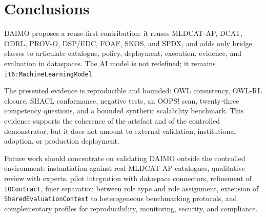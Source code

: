 \documentclass[Afour,sagev,times]{sagej}
\newcommand{\code}[1]{\texttt{#1}}
\begin{document}
\section{Conclusions}\label{sec:conclusion}

DAIMO proposes a reuse-first contribution: it reuses MLDCAT-AP, DCAT, ODRL, PROV-O, DSP/EDC, FOAF, SKOS, and SPDX, and adds only bridge classes to articulate catalogue, policy, deployment, execution, evidence, and evaluation in dataspaces. The AI model is not redefined; it remains \code{it6:MachineLearningModel}.

The presented evidence is reproducible and bounded: OWL consistency, OWL-RL closure, SHACL conformance, negative tests, an OOPS! scan, twenty-three competency questions, and a bounded synthetic scalability benchmark. This evidence supports the coherence of the artefact and of the controlled demonstrator, but it does not amount to external validation, institutional adoption, or production deployment.

Future work should concentrate on validating DAIMO outside the controlled environment: instantiation against real MLDCAT-AP catalogues, qualitative review with experts, pilot integration with dataspace connectors, refinement of \code{IOContract}, finer separation between role type and role assignment, extension of \code{SharedEvaluationContext} to heterogeneous benchmarking protocols, and complementary profiles for reproducibility, monitoring, security, and compliance.
\end{document}
